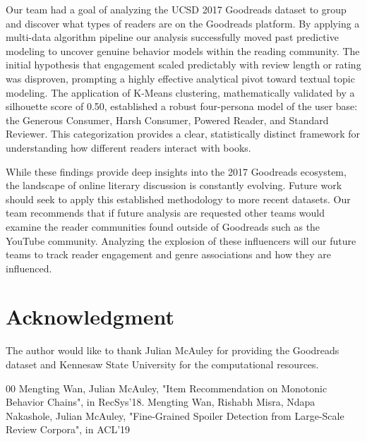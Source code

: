 \documentclass[conference]{IEEEtran}
\begin{document}
Our team had a goal of analyzing the UCSD 2017 Goodreads dataset to group and discover what types of readers are on the Goodreads platform. By applying a multi-data algorithm pipeline our analysis successfully moved past predictive modeling to uncover genuine behavior models within the reading community. The initial hypothesis that engagement scaled predictably with review length or rating was disproven, prompting a highly effective analytical pivot toward textual topic modeling. The application of K-Means clustering, mathematically validated by a silhouette score of 0.50, established a robust four-persona model of the user base: the Generous Consumer, Harsh Consumer, Powered Reader, and Standard Reviewer. This categorization provides a clear, statistically distinct framework for understanding how different readers interact with books.

While these findings provide deep insights into the 2017 Goodreads ecosystem, the landscape of online literary discussion is constantly evolving. Future work should seek to apply this established methodology to more recent datasets. Our team recommends that if future analysis are requested other teams would examine the reader communities found outside of Goodreads such as the YouTube community. Analyzing the explosion of these influencers will our future teams to track reader engagement and genre associations and how they are influenced.


\section*{Acknowledgment}
The author would like to thank Julian McAuley for providing the Goodreads dataset and Kennesaw State University for the computational resources.

\begin{thebibliography}{00}
 Mengting Wan, Julian McAuley, "Item Recommendation on Monotonic Behavior Chains", in RecSys'18.
 Mengting Wan, Rishabh Misra, Ndapa Nakashole, Julian McAuley, "Fine-Grained Spoiler Detection from Large-Scale Review Corpora", in ACL'19

\end{thebibliography}
\end{document}
